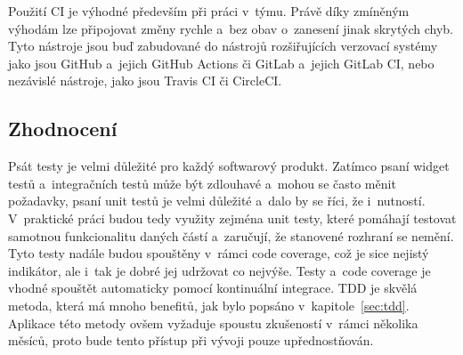 Použití CI je výhodné především při práci v~týmu.
Právě díky zmíněným výhodám lze připojovat změny rychle a~bez obav o~zanesení
jinak skrytých chyb.
Tyto nástroje jsou buď zabudované do nástrojů rozšiřujících verzovací systémy
jako jsou GitHub a~jejich GitHub Actions či GitLab a~jejich GitLab CI,
nebo nezávislé nástroje,
jako jsou Travis CI či CircleCI.~\cite{ci}

\subsection{Zhodnocení}

Psát testy je velmi důležité pro každý softwarový produkt.
Zatímco psaní widget testů a~integračních testů může být zdlouhavé
a~mohou se často měnit požadavky,
psaní unit testů je velmi důležité a~dalo by se říci,
že i~nutností.
V~praktické práci budou tedy využity zejména unit testy,
které pomáhají testovat samotnou funkcionalitu daných částí
a~zaručují,
že stanovené rozhraní se nemění.
Tyto testy nadále budou spouštěny v~rámci code coverage,
což je sice nejistý indikátor,
ale i~tak je dobré jej udržovat co nejvýše.
Testy a~code coverage je vhodné spouštět automaticky pomocí kontinuální
integrace.\linebreak
TDD je skvělá metoda,
která má mnoho benefitů,
jak bylo popsáno v~kapitole~\ref{sec:tdd}.
Aplikace této metody ovšem vyžaduje spoustu zkušeností
v~rámci několika měsíců,
proto bude tento přístup při vývoji pouze upřednostňován.
